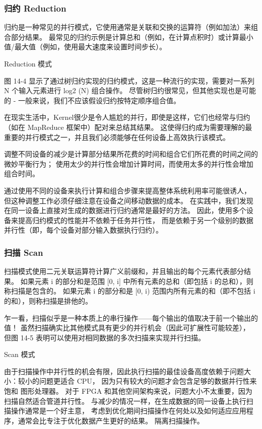 \subsubsection{归约 Reduction}
归约是一种常见的并行模式，它使用通常是关联和交换的运算符（例如加法）来组合部分结果。 
最常见的归约示例是计算总和（例如，在计算点积时）或计算最小值/最大值（例如，使用最大速度来设置时间步长）。

{\color{red} Reduction 模式}

图 14-4 显示了通过树归约实现的归约模式，这是一种流行的实现，需要对一系列 N 个输入元素进行 log2 (N) 组合操作。 
尽管树归约很常见，但其他实现也是可能的 - 一般来说，我们不应该假设归约按特定顺序组合值。

在现实生活中，Kernel很少是令人尴尬的并行，即使是这样，它们也经常与归约（如在 MapReduce 框架中）配对来总结其结果。 
这使得归约成为需要理解的最重要的并行模式之一，并且我们必须能够在任何设备上高效执行该模式。

调整不同设备的减少是计算部分结果所花费的时间和组合它们所花费的时间之间的微妙平衡行为； 
使用太少的并行性会增加计算时间，而使用太多的并行性会增加组合时间。

通过使用不同的设备来执行计算和组合步骤来提高整体系统利用率可能很诱人，
但这种调整工作必须仔细注意在设备之间移动数据的成本。 
在实践中，我们发现在同一设备上直接对生成的数据进行归约通常是最好的方法。 
因此，使用多个设备来提高归约模式的性能并不依赖于任务并行性，
而是依赖于另一个级别的数据并行性（即，每个设备对部分输入数据执行归约）。

\subsubsection{扫描 Scan}
扫描模式使用二元关联运算符计算广义前缀和，并且输出的每个元素代表部分结果。 
如果元素 i 的部分和是范围 [0, i] 中所有元素的总和（即包括 i 的总和），则称扫描是包含的。 
如果元素 i 的部分和是 [0, i) 范围内所有元素的和（即不包括 i 的和），则称扫描是排他的。

乍一看，扫描似乎是一种本质上的串行操作——每个输出的值取决于前一个输出的值！ 
虽然扫描确实比其他模式具有更少的并行机会（因此可扩展性可能较差），
但图 14-5 表明可以使用对相同数据的多次扫描来实现并行扫描。

{\color{red} Scan 模式}

由于扫描操作中并行性的机会有限，因此执行扫描的最佳设备高度依赖于问题大小：较小的问题更适合 CPU，
因为只有较大的问题才会包含足够的数据并行性来饱和 图形处理器。 
对于 FPGA 和其他空间架构来说，问题大小不太重要，因为扫描自然适合管道并行性。 
与减少的情况一样，在生成数据的同一设备上执行扫描操作通常是一个好主意，
考虑到优化期间扫描操作在何处以及如何适应应用程序，通常会比专注于优化数据产生更好的结果。 隔离扫描操作。

